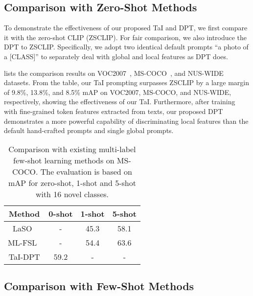 \documentclass[10pt,twocolumn,letterpaper]{article}
\begin{document}
\subsection{Comparison with Zero-Shot Methods}
\label{e:2}




To demonstrate the effectiveness of our proposed TaI and DPT, we first compare it with the zero-shot CLIP (ZSCLIP).
For fair comparison, we also introduce the DPT to ZSCLIP. 
Specifically, we adopt two identical default prompts ``a photo of a [CLASS]'' to separately deal with global and local features as DPT does.

 lists the comparison results on VOC2007~\cite{voc2007}, MS-COCO~\cite{coco}, and NUS-WIDE\cite{nuswide} datasets.
From the table, our TaI prompting surpasses ZSCLIP by a large margin of 9.8\%, 13.8\%, and 8.5\% mAP on VOC2007, MS-COCO, and NUS-WIDE, respectively, showing the effectiveness of our TaI.
Furthermore, after training with fine-grained token features extracted from texts, our proposed DPT demonstrates a more powerful capability of discriminating local features than the default hand-crafted prompts and single global prompts.










\begin{table}[h]
    \centering
    \caption{Comparison with existing multi-label few-shot learning methods on MS-COCO. The evaluation is based on mAP for zero-shot, 1-shot and 5-shot with 16 novel classes.}
    \vspace{-2mm}
    \setlength{\tabcolsep}{3.8mm}
    \begin{tabular}{c|ccc}
    \toprule
        Method & \textbf{0-shot} & 1-shot & 5-shot \\ \midrule
        LaSO~\cite{alfassy2019laso} & - & 45.3 & 58.1 \\ ML-FSL~\cite{simon2022meta} & - & 54.4 & 63.6 \\ TaI-DPT & 59.2 & - & - \\ \bottomrule
    \end{tabular}\vspace{-5mm}
    \label{tab:laso}
\end{table}

\subsection{Comparison with Few-Shot Methods}
\label{e:3}
\end{document}
